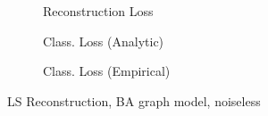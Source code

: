 \begin{figure}
\begin{subfigure}[T]{0.5\columnwidth}
    \caption{Reconstruction Loss}%
    \label{subsubfig:BA_noiseless_simple_LS_rec}
    \end{subfigure}
    \hfill%
    \begin{subfigure}[T]{0.5\columnwidth}
    \caption{Class. Loss (Analytic)}
    \label{subsubfig:BA_noiseless_simple_LS_class_anal}
    \end{subfigure}%
    \hfill
    \begin{subfigure}[T]{0.5\columnwidth}
    \caption{Class. Loss (Empirical)}%
    \label{subsubfig:BA_noiseless_simple_LS_class_emp}
    \end{subfigure}%
    \caption{LS Reconstruction, BA graph model, noiseless}
\label{subfig:BA_noiseless_simple_LS}
\end{figure}

